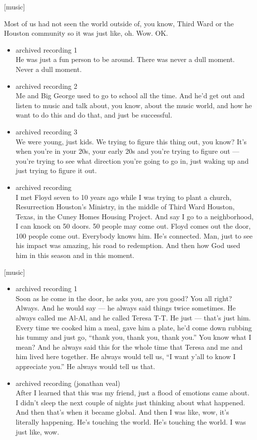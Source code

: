 {[}music{]}

Most of us had not seen the world outside of, you know, Third Ward or
the Houston community so it was just like, oh. Wow. OK.

\begin{itemize}
\item
  archived recording 1\\
  He was just a fun person to be around. There was never a dull moment.
  Never a dull moment.
\item
  archived recording 2\\
  Me and Big George used to go to school all the time. And he'd get out
  and listen to music and talk about, you know, about the music world,
  and how he want to do this and do that, and just be successful.
\item
  archived recording 3\\
  We were young, just kids. We trying to figure this thing out, you
  know? It's when you're in your 20s, your early 20s and you're trying
  to figure out --- you're trying to see what direction you're going to
  go in, just waking up and just trying to figure it out.
\item
  archived recording\\
  I met Floyd seven to 10 years ago while I was trying to plant a
  church, Resurrection Houston's Ministry, in the middle of Third Ward
  Houston, Texas, in the Cuney Homes Housing Project. And say I go to a
  neighborhood, I can knock on 50 doors. 50 people may come out. Floyd
  comes out the door, 100 people come out. Everybody knows him. He's
  connected. Man, just to see his impact was amazing, his road to
  redemption. And then how God used him in this season and in this
  moment.
\end{itemize}

{[}music{]}

\begin{itemize}
\item
  archived recording 1\\
  Soon as he come in the door, he asks you, are you good? You all right?
  Always. And he would say --- he always said things twice sometimes. He
  always called me Al-Al, and he called Teresa T-T. He just --- that's
  just him. Every time we cooked him a meal, gave him a plate, he'd come
  down rubbing his tummy and just go, ``thank you, thank you, thank
  you.'' You know what I mean? And he always said this for the whole
  time that Teresa and me and him lived here together. He always would
  tell us, ``I want y'all to know I appreciate you.'' He always would
  tell us that.
\item
  archived recording (jonathan veal)\\
  After I learned that this was my friend, just a flood of emotions came
  about. I didn't sleep the next couple of nights just thinking about
  what happened. And then that's when it became global. And then I was
  like, wow, it's literally happening. He's touching the world. He's
  touching the world. I was just like, wow.
\end{itemize}

